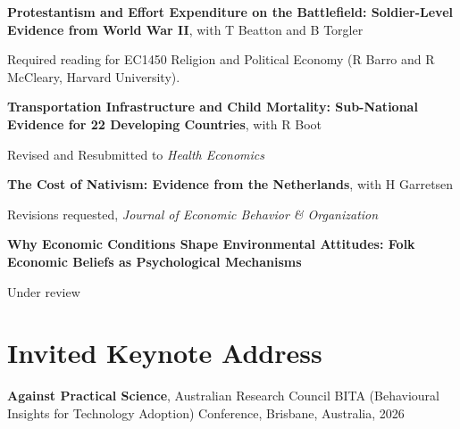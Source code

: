 \documentclass[letterpaper]{article}
\renewenvironment{itemize}{
  \begin{list}{}{
    \setlength{\leftmargin}{1.5em}
  }
}{
  \end{list}
}
\begin{document}
\begin{itemize}

\item \textbf{Protestantism and Effort Expenditure on the Battlefield: Soldier-Level Evidence from World War II}, with T Beatton and B Torgler
\vspace{-0.05in}
\begin{itemize}
\item Required reading for EC1450 Religion and Political Economy (R Barro and R McCleary, Harvard University).
\end{itemize}

\medskip

\item \textbf{Transportation Infrastructure and Child Mortality: Sub-National Evidence for 22 Developing Countries}, with R Boot
\vspace{-0.05in}
\begin{itemize}
\item Revised and Resubmitted to \textit{Health Economics}
\end{itemize}

\medskip

\item \textbf{The Cost of Nativism: Evidence from the Netherlands}, with H Garretsen
\vspace{-0.05in}
\begin{itemize}
\item Revisions requested, \textit{Journal of Economic Behavior \& Organization}
\end{itemize}

\medskip

\item \textbf{Why Economic Conditions Shape Environmental Attitudes: Folk Economic Beliefs as Psychological Mechanisms}
\vspace{-0.05in}
\begin{itemize}
\item Under review
\end{itemize}

\end{itemize}


\section*{Invited Keynote Address}

\begin{itemize}
\item \textbf{Against Practical Science}, Australian Research Council BITA (Behavioural Insights for Technology Adoption) Conference, Brisbane, Australia, 2026
\end{itemize}
\end{document}
